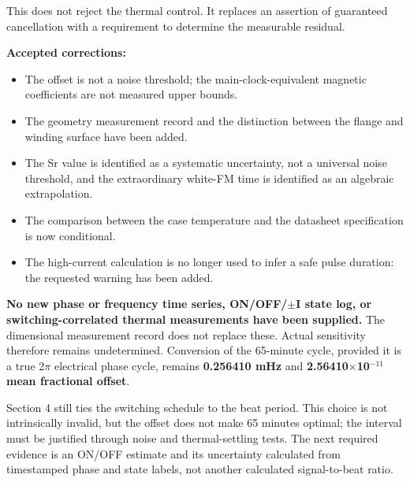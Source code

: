 \documentclass[10pt,a4paper]{article}
\begin{document}
{\begin{quote}
\end{quote}
\par
This does not reject the thermal control. It replaces an assertion of guaranteed cancellation with a requirement to determine the measurable residual.
\par
\vspace{2pt}\par\vspace{0.5pt}
\par
\textbf{Accepted corrections:}
\par
\begin{itemize}\setlength{\itemsep}{0.5pt}\setlength{\parskip}{0pt}\setlength{\topsep}{1pt}
\item The offset is not a noise threshold; the main-clock-equivalent magnetic coefficients are not measured upper bounds.
\item The geometry measurement record and the distinction between the flange and winding surface have been added.
\item The Sr value is identified as a systematic uncertainty, not a universal noise threshold, and the extraordinary white-FM time is identified as an algebraic extrapolation.
\item The comparison between the case temperature and the datasheet specification is now conditional.
\item The high-current calculation is no longer used to infer a safe pulse duration: the requested warning has been added.
\end{itemize}
\par
\textbf{No new phase or frequency time series, ON/OFF/$\pm$I state log, or switching-correlated thermal measurements have been supplied.} The dimensional measurement record does not replace these. Actual sensitivity therefore remains undetermined. Conversion of the 65-minute cycle, provided it is a true 2$\pi$ electrical phase cycle, remains \textbf{0.256410 mHz} and \textbf{2.56410$\times$10$^{-11}$ mean fractional offset}.
\par
Section 4 still ties the switching schedule to the beat period. This choice is not intrinsically invalid, but the offset does not make 65 minutes optimal; the interval must be justified through noise and thermal-settling tests. The next required evidence is an ON/OFF estimate and its uncertainty calculated from timestamped phase and state labels, not another calculated signal-to-beat ratio.
\par
}
\end{document}
